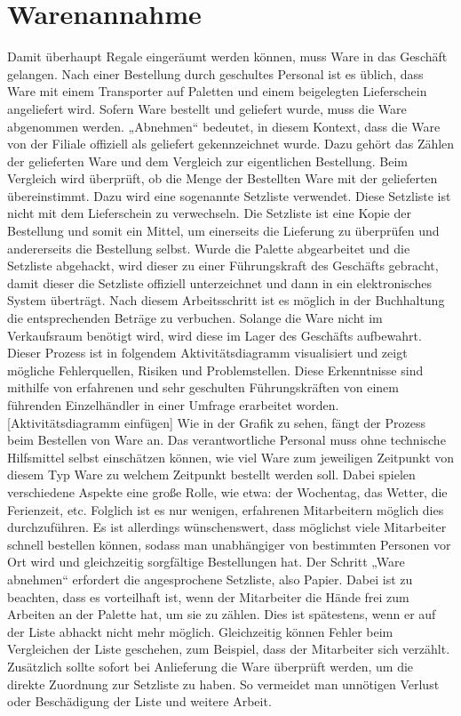 \section{Warenannahme}
\label{cha:warenannahme}
Damit überhaupt Regale eingeräumt werden können, muss Ware in das Geschäft gelangen. Nach einer Bestellung durch geschultes Personal ist es üblich, dass Ware mit einem Transporter auf Paletten und einem beigelegten Lieferschein angeliefert wird. Sofern Ware bestellt und geliefert wurde, muss die Ware abgenommen werden. „Abnehmen“ bedeutet, in diesem Kontext, dass die Ware von der Filiale offiziell als geliefert gekennzeichnet wurde. Dazu gehört das Zählen der gelieferten Ware und dem Vergleich zur eigentlichen Bestellung. Beim Vergleich wird überprüft, ob die Menge der Bestellten Ware mit der gelieferten übereinstimmt. Dazu wird eine sogenannte Setzliste verwendet. Diese Setzliste ist nicht mit dem Lieferschein zu verwechseln. Die Setzliste ist eine Kopie der Bestellung und somit ein Mittel, um einerseits die Lieferung zu überprüfen und andererseits die Bestellung selbst. 
Wurde die Palette abgearbeitet und die Setzliste abgehackt, wird dieser zu einer Führungskraft des Geschäfts gebracht, damit dieser die Setzliste offiziell unterzeichnet und dann in ein elektronisches System überträgt. Nach diesem Arbeitsschritt ist es möglich in der Buchhaltung die entsprechenden Beträge zu verbuchen.
Solange die Ware nicht im Verkaufsraum benötigt wird, wird diese im Lager des Geschäfts aufbewahrt. 
Dieser Prozess ist in folgendem Aktivitätsdiagramm visualisiert und zeigt mögliche Fehlerquellen, Risiken und Problemstellen. Diese Erkenntnisse sind mithilfe von erfahrenen und sehr geschulten Führungskräften von einem führenden Einzelhändler in einer Umfrage erarbeitet worden. 
[Aktivitätsdiagramm einfügen]
Wie in der Grafik zu sehen, fängt der Prozess beim Bestellen von Ware an. Das verantwortliche Personal muss ohne technische Hilfsmittel selbst einschätzen können, wie viel Ware zum jeweiligen Zeitpunkt von diesem Typ Ware zu welchem Zeitpunkt bestellt werden soll. Dabei spielen verschiedene Aspekte eine große Rolle, wie etwa: der Wochentag, das Wetter, die Ferienzeit, etc. 
Folglich ist es nur wenigen, erfahrenen Mitarbeitern möglich dies durchzuführen. Es ist allerdings wünschenswert, dass möglichst viele Mitarbeiter schnell bestellen können, sodass man unabhängiger von bestimmten Personen vor Ort wird und gleichzeitig sorgfältige Bestellungen hat.
Der Schritt „Ware abnehmen“ erfordert die angesprochene Setzliste, also Papier. Dabei ist zu beachten, dass es vorteilhaft ist, wenn der Mitarbeiter die Hände frei zum Arbeiten an der Palette hat, um sie zu zählen. Dies ist spätestens, wenn er auf der Liste abhackt nicht mehr möglich. Gleichzeitig können Fehler beim Vergleichen der Liste geschehen, zum Beispiel, dass der Mitarbeiter sich verzählt. Zusätzlich sollte sofort bei Anlieferung die Ware überprüft werden, um die direkte Zuordnung zur Setzliste zu haben. So vermeidet man unnötigen Verlust oder Beschädigung der Liste und weitere Arbeit. 
